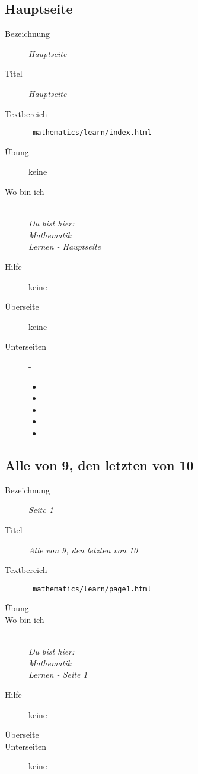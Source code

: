 \subsection{ Hauptseite }
\label{cha:math-learn-page0}
\begin{description}
  \item[Bezeichnung] \emph{ Hauptseite }
  \item[Titel] \emph{ Hauptseite }
  \item[Textbereich] \texttt{ mathematics/learn/index.html }
  \item[Übung] keine
  \item[Wo bin ich] \emph{\\Du bist hier:\\Mathematik\\Lernen - Hauptseite}
  \item[Hilfe] keine
  \item[Überseite] keine
  \item[Unterseiten] -
  \begin{itemize}
    \item {}
    \item {}
    \item {}
    \item {}
    \item {}
  \end{itemize}
\end{description}


\subsection{ Alle von 9, den letzten von 10 }
\label{cha:math-learn-page1}
\begin{description}
  \item[Bezeichnung] \emph{ Seite 1 }
  \item[Titel] \emph{ Alle von 9, den letzten von 10 }
  \item[Textbereich] \texttt{ mathematics/learn/page1.html }
  \item[Übung] 
  \item[Wo bin ich] \emph{\\Du bist hier:\\Mathematik\\Lernen - Seite 1 }
  \item[Hilfe] keine
  \item[Überseite] 
  \item[Unterseiten] keine
\end{description}



